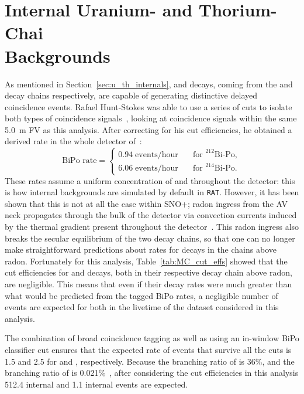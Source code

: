 \section{Internal Uranium- and Thorium-Chai\\Backgrounds}
As mentioned in Section~\ref{sec:u_th_internals},  and  decays, coming from the  and  decay chains respectively, are capable of generating distinctive delayed coincidence events. Rafael Hunt-Stokes was able to use a series of cuts to isolate both types of coincidence signals~\cite{hunt-stokesUraniumThoriumBackground2022}, %
looking at coincidence signals within the same \SI{5.0}{\m} FV as this analysis. After correcting for his cut efficiencies, he obtained a derived rate in the whole detector of~\cite{hunt-stokesPrivateCommunication2023}: %
\begin{equation*}
    \text{BiPo rate} = 
    \begin{cases}
        0.94\; \text{events/hour} & \quad \text{for } ^{212}\text{Bi-Po},\\
        6.06\; \text{events/hour} & \quad \text{for } ^{214}\text{Bi-Po}.
    \end{cases}
\end{equation*}
These rates assume a uniform concentration of  and  throughout the detector: this is how internal backgrounds are simulated by default in \texttt{RAT}. However, it has been shown that this is not at all the case within SNO+; radon ingress from the AV neck propagates through the bulk of the detector via convection currents induced by the thermal gradient present throughout the detector~\cite{wilsonThermallydrivenScintillatorFlow2023}. %
This radon ingress also breaks the secular equilibrium of the two decay chains, so that one can no longer make straightforward predictions about rates for decays in the chains above radon. Fortunately for this analysis, Table~\ref{tab:MC_cut_effs} showed that the cut efficiencies for  and  decays, both in their respective decay chain above radon, are negligible. This means that even if their decay rates were much greater than what would be predicted from the tagged BiPo rates, a negligible number of events are expected for both in the livetime of the dataset considered in this analysis.

The combination of broad coincidence tagging as well as using an in-window BiPo classifier cut ensures that the expected rate of  events that survive all the cuts is 1.5 and 2.5 for  and , respectively. Because the branching ratio of  is 36\%, and the branching ratio of  is 0.021\%~\cite{martinNuclearDataSheets2007,shamsuzzohabasuniaNuclearDataSheets2014}, %
after considering the cut efficiencies in this analysis 512.4 internal  and 1.1 internal  events are expected.

